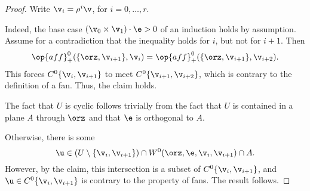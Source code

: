 \begin{proof} 
Write $\v_i = \rho^i \v$, for $i=0,\ldots,r$.

Indeed, the base case $(\v_0\times \v_1)\cdot \e > 0$ of an induction 
holds by assumption.  Assume for a contradiction that the inequality
holds for $i$, but not for $i+1$.  Then
\begin{displaymath}
  \op{aff}^0_+(\{\orz,\v_{i+1}\},\v_i) 
= \op{aff}^0_+(\{\orz,\v_{i+1}\},\v_{i+2}).
\end{displaymath} 
This forces $C^0\{\v_i,\v_{i+1}\}$ to meet $C^0\{\v_{i+1},\v_{i+2}\}$,
which is contrary to the definition of a fan.  Thus, the claim holds.

The fact that $U$ is cyclic follows trivially from the fact that $U$
is contained in a plane $A$ through $\orz$ and that $\e$ is orthogonal
to $A$.

Otherwise, there is some 
\begin{displaymath}
  \u \in (U\setminus \{\v_i,\v_{i+1}\}) 
\cap W^0(\orz,\e,\v_i,\v_{i+1}) \cap A.
\end{displaymath}
However, by the claim, this intersection is a subset of $C^0\{\v_i,\v_{i+1}\}$, and
$\u\in C^0\{\v_i,\v_{i+1}\}$ is contrary to the property
 of fans.  The result follows.
\end{proof}

